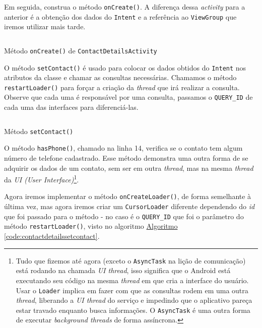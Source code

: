 \documentclass[a4paper,12pt,brazil,oneside]{book}
\begin{document}
\begin{singlespace}
	Em seguida, construa o método \texttt{onCreate()}. A diferença dessa \emph{activity} para a anterior é a obtenção dos dados do \texttt{Intent} e a referência ao \texttt{ViewGroup} que iremos utilizar mais tarde. 

		\begin{listing}[H]
		\inputminted[linenos=true,fontsize=\small,frame=lines, framesep=2mm, tabsize=2,numbersep=5pt]{java}{src/api/contacts/oncreate.java}
		\caption{Método \texttt{onCreate()} de \texttt{ContactDetailsActivity}}
		\label{code:contactdetailsoncreate}
		\end{listing} 	

	O método \texttt{setContact()} é usado para colocar os dados obtidos do \texttt{Intent} nos atributos da classe e chamar as consultas necessárias. Chamamos o método \texttt{restartLoader()} para forçar a criação da \emph{thread} que irá realizar a consulta. Observe que cada uma é responsável por uma consulta, passamos o \texttt{QUERY\_ID} de cada uma das interfaces para diferenciá-las.

		\begin{listing}[H]
		\inputminted[linenos=true,fontsize=\small,frame=lines, framesep=2mm, tabsize=2,numbersep=5pt]{java}{src/api/contacts/setcontact.java}
		\caption{Método \texttt{setContact()}}
		\label{code:contactdetailssetcontact}
		\end{listing} 			
	O método \texttt{hasPhone()}, chamado na linha 14, verifica se o contato tem algum número de telefone cadastrado. Esse método demonstra uma outra forma de se adquirir os dados de um contato, sem ser em outra \emph{thread}, mas na mesma \emph{thread} da \emph{UI (User Interface)}\footnote{Tudo que fizemos até agora (exceto o \texttt{AsyncTask} na lição de comunicação) está rodando na chamada \emph{UI thread}, isso significa que o Android está executando seu código na mesma \emph{thread} em que cria a interface do usuário. Usar o \texttt{Loader} implica em fazer com que as consultas rodem em uma outra \emph{thread}, liberando a \emph{UI thread} do serviço e impedindo que o aplicativo pareça estar travado enquanto busca informações. O \texttt{AsyncTask} é uma outra forma de executar \emph{background threads} de forma assíncrona.}. 

	
	Agora iremos implementar o método \texttt{onCreateLoader()}, de forma semelhante à última vez, mas agora iremos criar um \texttt{CursorLoader} diferente dependendo do \emph{id} que foi passado para o método - no caso é o \texttt{QUERY\_ID} que foi o parâmetro do método \texttt{restartLoader()}, visto no algoritmo \hyperref[code:contactdetailssetcontact]{Algoritmo \ref*{code:contactdetailssetcontact}}.
		

\end{singlespace}
\end{document}
